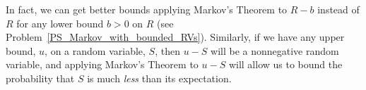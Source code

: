 In fact, we can get better bounds applying Markov's Theorem to $R-b$
instead of $R$ for any lower bound $b>0$ on $R$ (see
Problem~\ref{PS_Markov_with_bounded_RVs}).  Similarly, if we have any
upper bound, $u$, on a random variable, $S$, then $u-S$ will be a
nonnegative random variable, and applying Markov's Theorem to $u-S$
will allow us to bound the probability that $S$ is much \emph{less}
than its expectation.

\iffalse
Suppose we know that $R \geq \ell$, then can we do better?
Let $T=R-\ell$.  Note that $T \geq 0$.  So, we can use Markov's
Theorem on $T$, to say that 
\begin{eqnarray*}
\pr{R  \geq x }   & = &   \pr{T \geq x -\ell} 
  \leq 
  \frac{\expect{T}}{x -\ell} 
  =   \frac{\expect{R - \ell}}{x - \ell}
  =   \frac{\expect{R} - \ell}{x - \ell} \\
\end{eqnarray*}
This gives a somewhat better bound on the probability that
$R$ goes crazy!  
\fi

